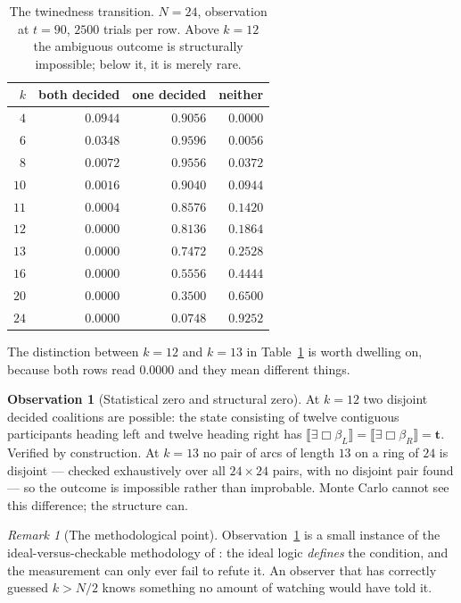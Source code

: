 \documentclass[11pt,a4paper]{article}
\theoremstyle{plain}
\theoremstyle{definition}
\newtheorem{observation}[theorem]{Observation}
\theoremstyle{remark}
\newtheorem{remark}[theorem]{Remark}
\newcommand{\Ebox}{\exists\Box}
\newcommand{\sem}[1]{\llbracket #1 \rrbracket}
\newcommand{\tv}{\mathbf{t}}
\begin{document}
\begin{table}[t]
\centering
\begin{tabular}{@{}rrrr@{}}
\toprule
$k$ & both decided & one decided & neither\\
\midrule
$4$  & $0.0944$ & $0.9056$ & $0.0000$\\
$6$  & $0.0348$ & $0.9596$ & $0.0056$\\
$8$  & $0.0072$ & $0.9556$ & $0.0372$\\
$10$ & $0.0016$ & $0.9040$ & $0.0944$\\
$11$ & $0.0004$ & $0.8576$ & $0.1420$\\
$12$ & $0.0000$ & $0.8136$ & $0.1864$\\
$13$ & $0.0000$ & $0.7472$ & $0.2528$\\
$16$ & $0.0000$ & $0.5556$ & $0.4444$\\
$20$ & $0.0000$ & $0.3500$ & $0.6500$\\
$24$ & $0.0000$ & $0.0748$ & $0.9252$\\
\bottomrule
\end{tabular}
\caption{The twinedness transition. $N = 24$, observation at $t = 90$, $2500$
trials per row. Above $k = 12$ the ambiguous outcome is structurally impossible;
below it, it is merely rare.}
\label{tab:twined}
\end{table}

The distinction between $k = 12$ and $k = 13$ in Table~\ref{tab:twined} is worth
dwelling on, because both rows read $0.0000$ and they mean different things.

\begin{observation}[Statistical zero and structural zero]\label{obs:twozeros}
At $k = 12$ two disjoint decided coalitions are possible: the state consisting
of twelve contiguous participants heading left and twelve heading right has
$\sem{\Ebox\beta_L} = \sem{\Ebox\beta_R} = \tv$. Verified by construction. At
$k = 13$ no pair of arcs of length $13$ on a ring of $24$ is disjoint --- checked
exhaustively over all $24 \times 24$ pairs, with no disjoint pair found --- so
the outcome is impossible rather than improbable. Monte Carlo cannot see this
difference; the structure can.
\end{observation}

\begin{remark}[The methodological point]
Observation~\ref{obs:twozeros} is a small instance of the ideal-versus-checkable
methodology of \cite{scientist,weighted}: the ideal logic \emph{defines} the
condition, and the measurement can only ever fail to refute it. An observer
that has correctly guessed $k > N/2$ knows something no amount of watching would
have told it.
\end{remark}
\end{document}
